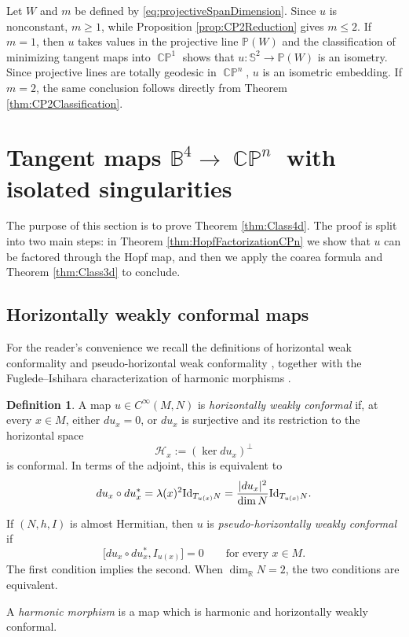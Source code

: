 \documentclass[11pt]{article}
\theoremstyle{plain}
\numberwithin{equation}{section}
\theoremstyle{definition}
\newtheorem{definition}[theorem]{Definition}
\let\oldendproof\endproof
\renewenvironment{proof}[1][\proofname]{%
\oldproof[\upshape \bfseries #1]%
}{\oldendproof}
\def \R {\mathbb{R}}
\def \mc{\mathcal}
\def \mb{\mathbb}
\def \Id{\textup{Id}}
\DeclareMathOperator{\CP}{\mathbb{CP}}
\begin{document}
\begin{proof}[Proof of Theorem \ref{thm:Class3d}]
Let $W$ and $m$ be defined by \eqref{eq:projectiveSpanDimension}.  Since
$u$ is nonconstant, $m\geq1$, while
Proposition \ref{prop:CP2Reduction} gives $m\leq2$.
If $m=1$, then $u$ takes values in the projective line $\mb P(W)$ and the
classification of minimizing tangent maps into $\CP^1$
\cite{Brezis1986} shows that
$u\colon\mb S^2\to\mb P(W)$ is an isometry.  Since projective lines are
totally geodesic in $\CP^n$, $u$ is an isometric embedding.  If
$m=2$, the same conclusion follows directly from Theorem
\ref{thm:CP2Classification}.  
\end{proof}


\section{Tangent maps \texorpdfstring{$\mb B^4\to \CP^n$}{B4 to CPn} with isolated singularities}\label{sec:B4CPn}

The purpose of this section is to prove Theorem \ref{thm:Class4d}. The proof is split into two main steps: in Theorem \ref{thm:HopfFactorizationCPn} we show that $u$ can be factored through the Hopf map, and then we apply the coarea formula and Theorem \ref{thm:Class3d} to conclude.


\subsection{Horizontally weakly conformal maps}

For the reader's convenience we recall the definitions of horizontal weak conformality
\cite[Definition~2.4.2]{Baird2003} and pseudo-horizontal weak conformality
\cite[Definition~8.2.3]{Baird2003}, together with the Fuglede--Ishihara
characterization of harmonic morphisms \cite[Theorem~4.2.2]{Baird2003}.

\begin{definition}
\label{def:HWC}
A map $u\in C^\infty(M,N)$ is \textit{horizontally weakly conformal} if, at every
$x\in M$, either $du_x=0$, or $du_x$ is surjective and its restriction
to the horizontal space
\[
    \mc H_x:=(\ker du_x)^\perp
\]
is conformal.  In terms of the adjoint, this is equivalent to
\[
    du_x\circ du_x^*
    =\lambda(x)^2\Id_{T_{u(x)}N}
    =\frac{|du_x|^2}{\dim N}\Id_{T_{u(x)}N}.
\]

If $(N,h,I)$ is almost Hermitian, then $u$ is
\textit{pseudo-horizontally weakly conformal} if
\begin{equation}
    \label{eq:PseudoHorizontalWeakConformality}
    \bigl[du_x\circ du_x^*,I_{u(x)}\bigr]=0
    \qquad\text{for every }x\in M.
\end{equation}
The first condition implies the second.  When $\dim_\R N=2$, the two
conditions are equivalent.

A \textit{harmonic morphism} is a map which  is harmonic and horizontally weakly conformal.
\end{definition}
\end{document}
